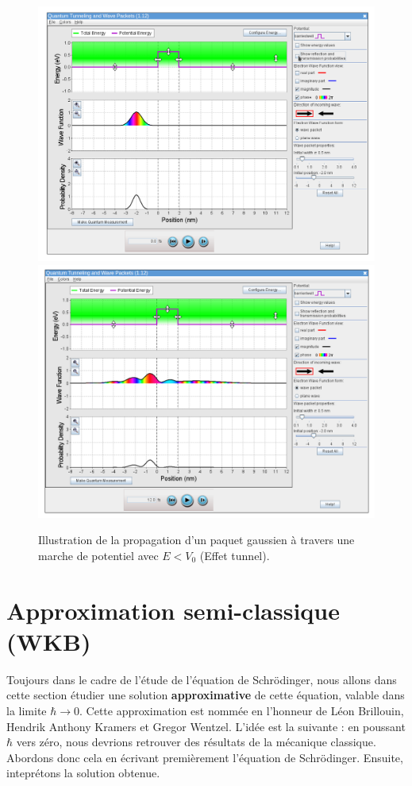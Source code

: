 \documentclass{book}
\begin{document}
\begin{figure}
  \centering
  \includegraphics[width=0.9\linewidth]{images/chap3-effet_tunnel.png} \\
  \includegraphics[width=0.9\linewidth]{images/chap3-effet_tunnel-2.png} 
  \caption{Illustration de la propagation d'un paquet gaussien à travers une marche de potentiel avec $E<V_0$ (Effet tunnel).}
  \label{fig:chap3-illustration_effet_tunnel}
\end{figure}
\newpage
\section{Approximation semi-classique (WKB)}
Toujours dans le cadre de l'étude de l'équation de Schrödinger, nous allons dans cette section étudier une solution \textbf{approximative} de cette équation, valable dans la limite $\hbar \longrightarrow0$. Cette approximation est nommée en l'honneur de Léon Brillouin, Hendrik Anthony Kramers et Gregor Wentzel. L'idée est la suivante : en poussant $\hbar$ vers zéro, nous devrions retrouver des résultats de la mécanique classique. Abordons donc cela en écrivant premièrement l'équation de Schrödinger. Ensuite, inteprétons la solution obtenue.
\end{document}
